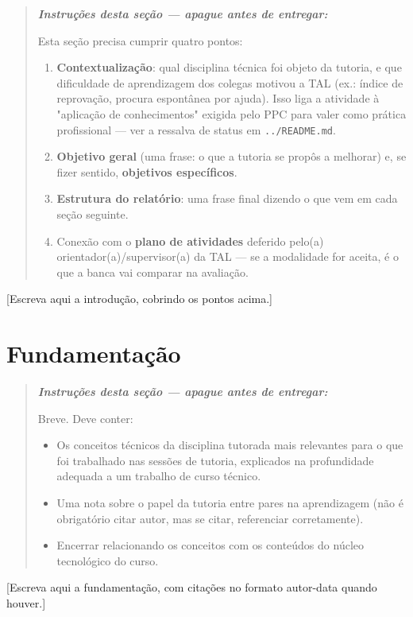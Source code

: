 \documentclass[article,12pt,a4paper]{abntex2}
\newenvironment{instrucoes}{%
  \begin{quotation}\footnotesize\itshape
  \noindent\textbf{\upshape Instruções desta seção — apague antes de entregar:}\par\smallskip
}{%
  \end{quotation}
}
\begin{document}
\begin{instrucoes}
Esta seção precisa cumprir quatro pontos:
\begin{enumerate}
  \item \textbf{Contextualização}: qual disciplina técnica foi objeto da tutoria, e que dificuldade de aprendizagem dos colegas motivou a TAL (ex.: índice de reprovação, procura espontânea por ajuda). Isso liga a atividade à "aplicação de conhecimentos" exigida pelo PPC para valer como prática profissional — ver a ressalva de status em \texttt{../README.md}.
  \item \textbf{Objetivo geral} (uma frase: o que a tutoria se propôs a melhorar) e, se fizer sentido, \textbf{objetivos específicos}.
  \item \textbf{Estrutura do relatório}: uma frase final dizendo o que vem em cada seção seguinte.
  \item Conexão com o \textbf{plano de atividades} deferido pelo(a) orientador(a)/supervisor(a) da TAL — se a modalidade for aceita, é o que a banca vai comparar na avaliação.
\end{enumerate}
\end{instrucoes}

[Escreva aqui a introdução, cobrindo os pontos acima.]

\section{Fundamentação}

\begin{instrucoes}
Breve. Deve conter:
\begin{itemize}
  \item Os conceitos técnicos da disciplina tutorada mais relevantes para o que foi trabalhado nas sessões de tutoria, explicados na profundidade adequada a um trabalho de curso técnico.
  \item Uma nota sobre o papel da tutoria entre pares na aprendizagem (não é obrigatório citar autor, mas se citar, referenciar corretamente).
  \item Encerrar relacionando os conceitos com os conteúdos do núcleo tecnológico do curso.
\end{itemize}
\end{instrucoes}

[Escreva aqui a fundamentação, com citações no formato autor-data quando houver.]

\end{document}
